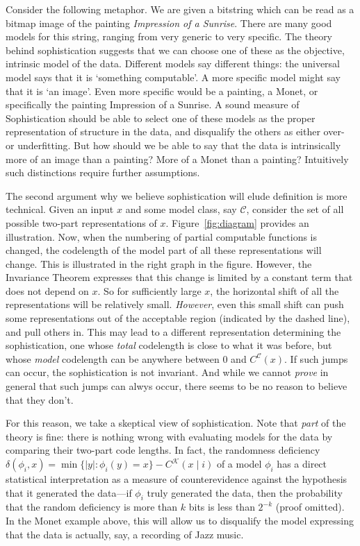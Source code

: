 \documentclass{style/llncs}
\newcommand{\C}{\mathscr C}
\newcommand{\K}{\mathscr K}
\begin{document}
Consider the following metaphor. We are given a bitstring which can be read as a bitmap image of the painting \emph{Impression of a Sunrise}. There are many good models for this string, ranging from very generic to very specific. The theory behind sophistication suggests that we can choose one of these as the objective, intrinsic model of the data. Different models say different things: the universal model says that it is `something computable'. A more specific model might say that it is `an image'. Even more specific would be a painting, a Monet, or specifically the painting Impression of a Sunrise. A sound measure of Sophistication should be able to select one of these models as the proper representation of structure in the data, and disqualify the others as either over- or underfitting. But how should we be able to say that the data is intrinsically more of an image than a painting? More of a Monet than a painting? Intuitively such distinctions require further assumptions.

The second argument why we believe sophistication will elude definition is more technical. Given an input $x$ and some model class, say $\C$, consider the set of all possible two-part representations of $x$. Figure~\ref{fig:diagram} provides an illustration. Now, when the numbering of partial computable functions is changed, the codelength of the model part of all these representations will change. This is illustrated in the right graph in the figure. However, the Invariance Theorem expresses that this change is limited by a constant term that does not depend on $x$. So for sufficiently large $x$, the horizontal shift of all the representations will be relatively small. \emph{However}, even this small shift can push some representations out of the acceptable region (indicated by the dashed line), and pull others in. This may lead to a different representation determining the sophistication, one whose \emph{total} codelength is close to what it was before, but whose \emph{model} codelength can be anywhere between $0$ and $C^\C(x)$. If such jumps can occur, the sophistication is not invariant. And while we cannot \emph{prove} in general that such jumps can alwys occur, there seems to be no reason to believe that they don't.

For this reason, we take a skeptical view of sophistication. Note that \emph{part} of the theory is fine: there is nothing wrong with evaluating models for the data by comparing their two-part code lengths. In fact, the randomness deficiency $\delta(\phi_i,x)=\min\{|y|:\phi_i(y)=x\}-C^\K(x\mid i)$ of a model $\phi_i$ has a direct statistical interpretation as a measure of counterevidence against the hypothesis that it generated the data---if $\phi_i$ truly generated the data, then the probability that the random deficiency is more than $k$ bits is less than $2^{-k}$ (proof omitted). In the Monet example above, this will allow us to disqualify the model expressing that the data is actually, say, a recording of Jazz music.
\end{document}

